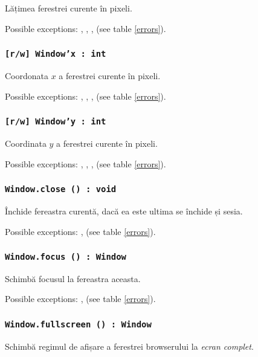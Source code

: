 Lățimea ferestrei curente în pixeli.

Possible exceptions: , , ,  (see table \ref{errors}).

\subsubsection{\texttt{[r/w] Window'x : int}}

Coordonata $x$ a ferestrei curente în pixeli.

Possible exceptions: , , ,  (see table \ref{errors}).

\subsubsection{\texttt{[r/w] Window'y : int}}

Coordinata $y$ a ferestrei curente în pixeli.

Possible exceptions: , , ,  (see table \ref{errors}).

\subsubsection{\texttt{Window.close () : void}}

Închide fereastra curentă, dacă ea este ultima se închide și sesia.

Possible exceptions: ,  (see table \ref{errors}).

\subsubsection{\texttt{Window.focus () : Window}}

Schimbă focusul la fereastra aceasta.

Possible exceptions: ,  (see table \ref{errors}).

\subsubsection{\texttt{Window.fullscreen () : Window}}

Schimbă regimul de afișare a ferestrei browserului la \textit{ecran complet}.

